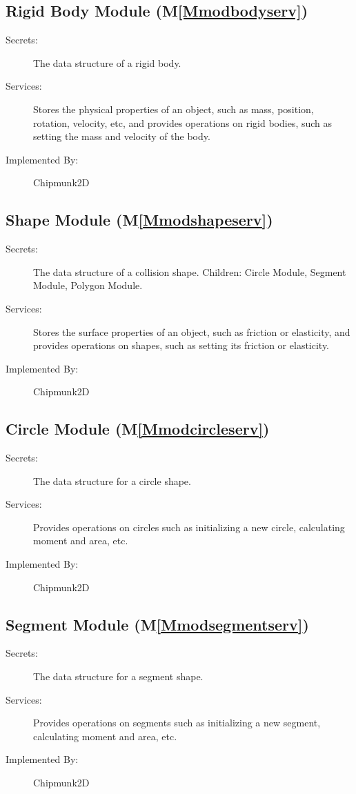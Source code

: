 \documentclass[12pt]{article}
\begin{document}
\subsection{Rigid Body Module (M\ref{Mmodbodyserv})}
\label{Sec:RBM()}
\begin{description}
\item[Secrets:]The data structure of a rigid body.
\item[Services:]Stores the physical properties of an object, such as mass, position, rotation, velocity, etc, and provides operations on rigid bodies, such as setting the mass and velocity of the body.
\item[Implemented By:]Chipmunk2D
\end{description}
\subsection{Shape Module (M\ref{Mmodshapeserv})}
\label{Sec:SM()}
\begin{description}
\item[Secrets:]The data structure of a collision shape. Children: Circle Module, Segment Module, Polygon Module.
\item[Services:]Stores the surface properties of an object, such as friction or elasticity, and provides operations on shapes, such as setting its friction or elasticity.
\item[Implemented By:]Chipmunk2D
\end{description}
\subsection{Circle Module (M\ref{Mmodcircleserv})}
\label{Sec:CM()}
\begin{description}
\item[Secrets:]The data structure for a circle shape.
\item[Services:]Provides operations on circles such as initializing a new circle, calculating moment and area, etc.
\item[Implemented By:]Chipmunk2D
\end{description}
\subsection{Segment Module (M\ref{Mmodsegmentserv})}
\label{Sec:SM()}
\begin{description}
\item[Secrets:]The data structure for a segment shape.
\item[Services:]Provides operations on segments such as initializing a new segment, calculating moment and area, etc.
\item[Implemented By:]Chipmunk2D
\end{description}
\end{document}
